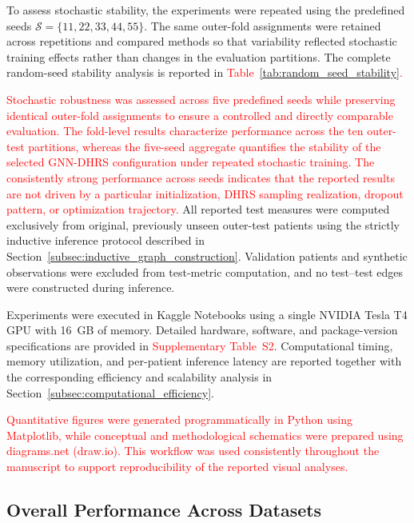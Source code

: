 \documentclass[pdflatex,sn-mathphys-num]{sn-jnl}%
\theoremstyle{thmstyleone}%
\theoremstyle{thmstyletwo}%
\theoremstyle{thmstylethree}%
\begin{document}
{
To assess stochastic stability, the experiments were repeated using the
predefined seeds
\(\mathcal{S}=\{11,22,33,44,55\}\). The same outer-fold assignments were
retained across repetitions and compared methods so that variability reflected
stochastic training effects rather than changes in the evaluation partitions.
The complete random-seed stability analysis is reported in
\textcolor{red}{Table~\ref{tab:random_seed_stability}.}
}

\textcolor{red}{
Stochastic robustness was assessed across five predefined seeds while
preserving identical outer-fold assignments to ensure a controlled and directly
comparable evaluation. The fold-level results characterize performance across
the ten outer-test partitions, whereas the five-seed aggregate quantifies the
stability of the selected GNN-DHRS configuration under repeated stochastic
training. The consistently strong performance across seeds indicates that the
reported results are not driven by a particular initialization, DHRS sampling
realization, dropout pattern, or optimization trajectory.
}
 {
All reported test measures were computed exclusively from original,
previously unseen outer-test patients using the strictly inductive inference
protocol described in
Section~\ref{subsec:inductive_graph_construction}. Validation patients and
synthetic observations were excluded from test-metric computation, and no
test--test edges were constructed during inference.
}

 {
Experiments were executed in Kaggle Notebooks using a single NVIDIA Tesla T4
GPU with 16~GB of memory. Detailed hardware, software, and package-version
specifications are provided in \textcolor{red}{Supplementary Table~S2}. Computational timing,
memory utilization, and per-patient inference latency are reported together
with the corresponding efficiency and scalability analysis in
Section~\ref{subsec:computational_efficiency}.
}

\textcolor{red}{
Quantitative figures were generated programmatically in Python using
Matplotlib, while conceptual and methodological schematics were prepared
using diagrams.net (draw.io). This workflow was used consistently throughout
the manuscript to support reproducibility of the reported visual analyses.
}
\subsection{Overall Performance Across Datasets}
\label{subsec:overall_performance}
\end{document}
